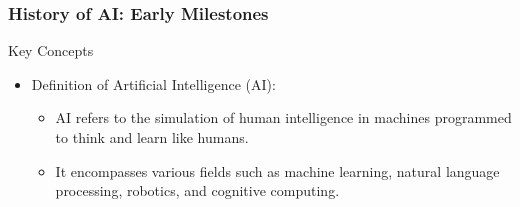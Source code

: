 \documentclass{beamer}
\begin{document}
\begin{frame}[fragile]
    \frametitle{History of AI: Early Milestones}
    \begin{block}{Key Concepts}
        \begin{itemize}
            \item Definition of Artificial Intelligence (AI):
            \begin{itemize}
                \item AI refers to the simulation of human intelligence in machines programmed to think and learn like humans.
                \item It encompasses various fields such as machine learning, natural language processing, robotics, and cognitive computing.
            \end{itemize}
        \end{itemize}
    \end{block}
\end{frame}
\end{document}
